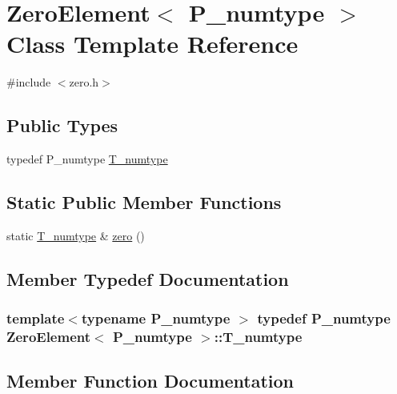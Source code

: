\hypertarget{classZeroElement}{}\section{Zero\+Element$<$ P\+\_\+numtype $>$ Class Template Reference}
\label{classZeroElement}


{\ttfamily \#include $<$zero.\+h$>$}

\subsection*{Public Types}
\begin{DoxyCompactItemize}
\item 
typedef P\+\_\+numtype \hyperlink{classZeroElement_a7875bd7b7cb6515725d60df536fa888f}{T\+\_\+numtype}
\end{DoxyCompactItemize}
\subsection*{Static Public Member Functions}
\begin{DoxyCompactItemize}
\item 
static \hyperlink{classZeroElement_a7875bd7b7cb6515725d60df536fa888f}{T\+\_\+numtype} \& \hyperlink{classZeroElement_a2750b4bfa1587be1566edfda86ef17da}{zero} ()
\end{DoxyCompactItemize}


\subsection{Member Typedef Documentation}
\hypertarget{classZeroElement_a7875bd7b7cb6515725d60df536fa888f}{}
\subsubsection[{T\+\_\+numtype}]{\setlength{\rightskip}{0pt plus 5cm}template$<$typename P\+\_\+numtype $>$ typedef P\+\_\+numtype {\bf Zero\+Element}$<$ P\+\_\+numtype $>$\+::{\bf T\+\_\+numtype}}\label{classZeroElement_a7875bd7b7cb6515725d60df536fa888f}


\subsection{Member Function Documentation}
\hypertarget{classZeroElement_a2750b4bfa1587be1566edfda86ef17da}{}
